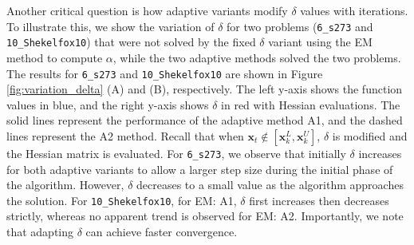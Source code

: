 \documentclass{elsarticle}
\numberwithin{equation}{section}
\begin{document}
Another critical question is how adaptive variants modify $\delta$ values with iterations. To illustrate this, we show the variation of $\delta$ for two problems (\texttt{6\_s273} and {\texttt{10\_Shekelfox10}}) that were not solved by the fixed $\delta$ variant using the EM method to compute $\alpha$, while the two adaptive methods solved the two problems. The results for \texttt{6\_s273} and {\texttt{10\_Shekelfox10}} are shown in Figure \ref{fig:variation_delta} (A) and (B), respectively. The left y-axis shows the function values in blue, and the right y-axis shows $\delta$ in red with Hessian evaluations. The solid lines represent the performance of the adaptive method A1, and the dashed lines represent the A2 method. Recall that when $\textbf{x}_t\notin [\textbf{x}_k^L, \textbf{x}_k^U]$, $\delta$ is modified and the Hessian matrix is evaluated. For \texttt{6\_s273}, we observe that initially $\delta$ increases for both adaptive variants to allow a larger step size during the initial phase of the algorithm. However, $\delta$ decreases to a small value as the algorithm approaches the solution. For {\texttt{10\_Shekelfox10}}, for EM: A1, $\delta$ first increases then decreases strictly, whereas no apparent trend is observed for EM: A2. Importantly, we note that adapting $\delta$ can achieve faster convergence.



\end{document}
